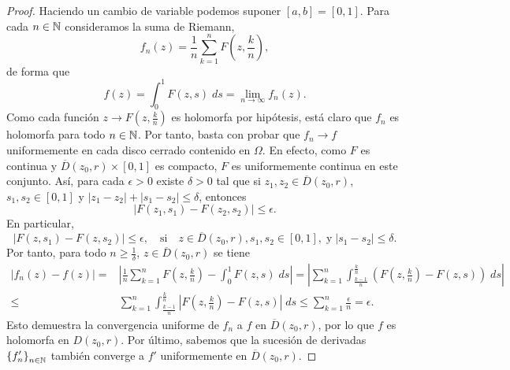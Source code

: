 \begin{proof}
	Haciendo un cambio de variable podemos suponer $\displaystyle \left[a,b\right] = \left[0,1\right]  $. Para cada $\displaystyle n \in \mathbb{N} $ consideramos la suma de Riemann, 
	\[f_{n}\left(z\right)=\frac{1}{n}\sum^{n}_{k = 1}F\left(z, \frac{k }{n}\right) ,\]
	de forma que 
	\[f\left(z\right)= \int^{1}_{0} F\left(z,s\right) \; d s = \lim_{n \to \infty}f_{n}\left(z\right) .\]
Como cada función $\displaystyle z \to F\left(z, \frac{k}{n}\right) $ es holomorfa por hipótesis, está claro que $\displaystyle f_{n} $ es holomorfa para todo $\displaystyle n \in \mathbb{N} $. Por tanto, basta con probar que $\displaystyle f_{n} \to f $ uniformemente en cada disco cerrado contenido en $\displaystyle \Omega  $. 
En efecto, como $\displaystyle F $ es continua y $\displaystyle \overline{D}\left(z_{0}, r\right)\times \left[0,1\right]  $ es compacto, $\displaystyle F $ es uniformemente continua en este conjunto. Así, para cada $\displaystyle \epsilon > 0 $ existe $\displaystyle \delta > 0 $ tal que si $\displaystyle z_{1}, z_{2} \in \overline{D}\left(z_{0}, r\right) $, $\displaystyle s_{1}, s_{2} \in \left[0,1\right]  $ y $\displaystyle \left|z_{1}-z_{2}\right| + \left|s_{1}-s_{2}\right|\leq\delta  $, entonces
\[ \left|F\left(z_{1}, s_{1}\right)-F\left(z_{2}, s_{2}\right)\right|\leq \epsilon  .\]
En particular, 
\[ \left|F\left(z, s_{1}\right)-F\left(z, s_{2}\right)\right|\leq \epsilon, \quad \text{si} \quad z \in \overline{D}\left(z_{0}, r\right), s_{1}, s_{2} \in \left[0,1\right] , \; \text{y} \; \left|s_{1}-s_{2}\right|\leq \delta  .\]
Por tanto, para todo $\displaystyle n \geq \frac{1}{\delta } $, $\displaystyle z \in \overline{D}\left(z_{0}, r\right) $ se tiene 
\[
\begin{split}
	\left|f_{n}\left(z\right)-f\left(z\right)\right| = & \left|\frac{1}{n}\sum^{n}_{k = 1}F\left(z, \frac{k}{n}\right)-\int^{1}_{0} F\left(z,s\right) \; d s\right| = \left|\sum^{n}_{k = 1}\int^{\frac{k}{n}}_{\frac{k-1}{n}} \left(F\left(z, \frac{k}{n}\right)-F\left(z,s\right)\right) \; d s\right| \\
	\leq & \sum^{n}_{k = 1}\int^{\frac{k}{n}}_{\frac{k-1}{n}} \left|F\left(z,\frac{k}{n}\right)-F\left(z,s\right)\right| \; d s \leq \sum^{n}_{k = 1}\frac{\epsilon }{n} = \epsilon .
\end{split}
\]
Esto demuestra la convergencia uniforme de $\displaystyle f_{n} $ a $\displaystyle f $ en $\displaystyle \overline{D}\left(z_{0}, r\right) $, por lo que $\displaystyle f $ es holomorfa en $\displaystyle D\left(z_{0}, r\right) $. Por último, sabemos que la sucesión de derivadas $\displaystyle \left\{ f'_{n}\right\} _{n\in\mathbb{N}} $ también converge a $\displaystyle f' $ uniformemente en $\displaystyle \overline{D}\left(z_{0}, r\right) $. 

\end{proof}
